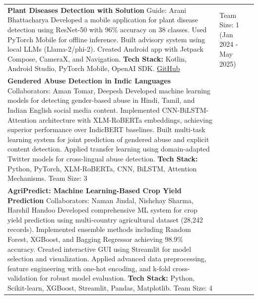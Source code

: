 \documentclass[10pt]{extarticle}
\begin{document}
\begin{contained}
\begin{longtable}{p{}p{}p{}}
    
    \textbf{Plant Diseases Detection with Solution} \newline
    Guide: Arani Bhattacharya \newline
    Developed a mobile application for plant disease detection using ResNet-50 with 96\% accuracy on 38 classes. Used PyTorch Mobile for offline inference. Built advisory system using local LLMs (Llama-2/phi-2). Created Android app with Jetpack Compose, CameraX, and Navigation. 
    \newline \textbf{Tech Stack:} Kotlin, Android Studio, PyTorch Mobile, OpenAI SDK. \newline
    \href{https://github.com/Himanshu8368/MC_project}{GitHub} &
    Team Size: 1 \newline (Jan 2024 - May 2025)\\


    \textbf{Gendered Abuse Detection in Indic Languages} \newline
    Collaborators: Aman Tomar, Deepesh \newline
    Developed machine learning models for detecting gender-based abuse in Hindi, Tamil, and Indian English social media content. Implemented CNN-BiLSTM-Attention architecture with XLM-RoBERTa embeddings, achieving superior performance over IndicBERT baselines. Built multi-task learning system for joint prediction of gendered abuse and explicit content detection. Applied transfer learning using domain-adapted Twitter models for cross-lingual abuse detection.
    \newline \textbf{Tech Stack:} Python, PyTorch, XLM-RoBERTa, CNN, BiLSTM, Attention Mechanisms. \newline
    Team Size: 3 \\

    \textbf{AgriPredict: Machine Learning-Based Crop Yield Prediction} \newline
    Collaborators: Naman Jindal, Nishchay Sharma, Harshil Handoo \newline
    Developed comprehensive ML system for crop yield prediction using multi-country agricultural dataset (28,242 records). Implemented ensemble methods including Random Forest, XGBoost, and Bagging Regressor achieving 98.9\% accuracy. Created interactive GUI using Streamlit for model selection and visualization. Applied advanced data preprocessing, feature engineering with one-hot encoding, and k-fold cross-validation for robust model evaluation.
    \newline \textbf{Tech Stack:} Python, Scikit-learn, XGBoost, Streamlit, Pandas, Matplotlib. \newline
    Team Size: 4 \\


\end{longtable}
\end{contained}
\end{document}
